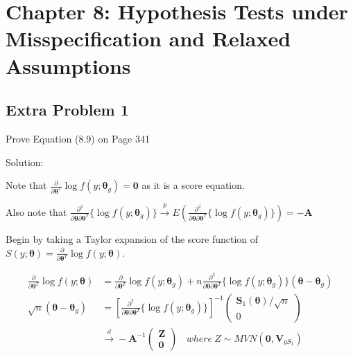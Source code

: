 \documentclass[
  letterpaper,
  DIV=11,
  numbers=noendperiod]{scrreprt}
\begin{document}

\hypertarget{chapter-8-hypothesis-tests-under-misspecification-and-relaxed-assumptions}{%
\chapter{Chapter 8: Hypothesis Tests under Misspecification and Relaxed
Assumptions}\label{chapter-8-hypothesis-tests-under-misspecification-and-relaxed-assumptions}}

\hypertarget{extra-problem-1}{%
\section{Extra Problem 1}\label{extra-problem-1}}

Prove Equation (8.9) on Page 341

Solution:

Note that
\(\frac \partial {\partial \boldsymbol \theta^T} \log f(y;\boldsymbol \theta_g) = \mathbf 0\)
as it is a score equation.

Also note that
\(\frac {\partial^2} {\partial \boldsymbol \theta \partial \boldsymbol \theta^T} \{\log f(y;{\boldsymbol \theta}_g)\} \overset p \to E \left( \frac {\partial^2} {\partial \boldsymbol \theta \partial \boldsymbol \theta^T} \{\log f(y;{\boldsymbol \theta}_g)\} \right)= - \mathbf A\)

Begin by taking a Taylor expansion of the score function of
\(S(y;\boldsymbol \theta) = \frac \partial {\partial \boldsymbol \theta^T} \log f(y;\boldsymbol \theta)\).

\[\begin{aligned}
\frac \partial {\partial \boldsymbol \theta^T} \log f(y;\boldsymbol \theta) &= \frac \partial {\partial \boldsymbol \theta^T} \log f(y;\boldsymbol \theta_g) + n\frac {\partial^2} {\partial \boldsymbol \theta \partial \boldsymbol \theta^T} \{\log f(y;{\boldsymbol \theta}_g)\}(\boldsymbol \theta -  {\boldsymbol \theta}_g) \\
\sqrt n(\boldsymbol \theta -  {\boldsymbol \theta}_g) &= \left[\frac {\partial^2} {\partial \boldsymbol \theta \partial \boldsymbol \theta^T} \{\log f(y;{\boldsymbol \theta}_g)\}\right]^{-1}\begin{pmatrix} \mathbf S_1 (\boldsymbol \theta)/ \sqrt n \\ 0 \end{pmatrix} \\
& \overset d \to -\mathbf A^{-1} \begin{pmatrix} \mathbf Z \\ \mathbf 0 \end{pmatrix} ~~~~ where~ Z \sim MVN\left(\mathbf 0,\mathbf V_{gS_1}\right)
\end{aligned}\]
\end{document}
